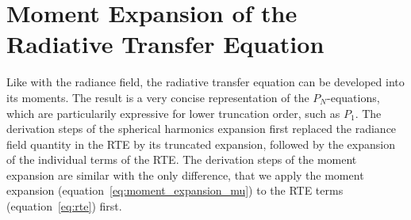\section{Moment Expansion of the Radiative Transfer Equation}
\label{sec:da_moment_expansion_RTE}


Like with the radiance field, the radiative transfer equation can be developed into its moments. The result is a very concise representation of the $P_N$-equations, which are particularily expressive for lower truncation order, such as $P_1$. The derivation steps of the spherical harmonics expansion first replaced the radiance field quantity in the RTE by its truncated expansion, followed by the expansion of the individual terms of the RTE. The derivation steps of the moment expansion are similar with the only difference, that we apply the moment expansion (equation~\ref{eq:moment_expansion_mu}) to the RTE terms (equation~\ref{eq:rte}) first.


